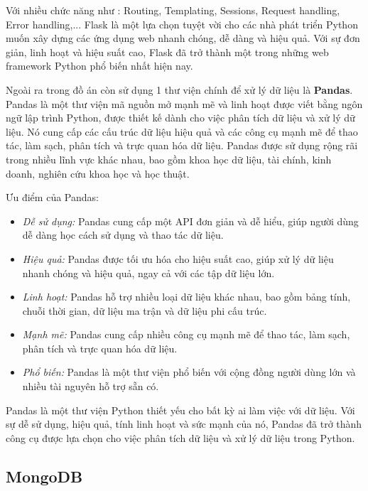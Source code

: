  Với nhiều chức năng như : Routing, Templating, Sessions, Request handling, Error handling,... Flask là một lựa chọn tuyệt vời cho các nhà phát triển Python muốn xây dựng các ứng dụng web nhanh chóng, dễ dàng và hiệu quả. Với sự đơn giản, linh hoạt và hiệu suất cao, Flask đã trở thành một trong những web framework Python phổ biến nhất hiện nay.

Ngoài ra trong đồ án còn sử dụng 1 thư viện chính để xử lý dữ liệu là \textbf{Pandas}. Pandas là một thư viện mã nguồn mở mạnh mẽ và linh hoạt được viết bằng ngôn ngữ lập trình Python, được thiết kế dành cho việc phân tích dữ liệu và xử lý dữ liệu. Nó cung cấp các cấu trúc dữ liệu hiệu quả và các công cụ mạnh mẽ để thao tác, làm sạch, phân tích và trực quan hóa dữ liệu. Pandas được sử dụng rộng rãi trong nhiều lĩnh vực khác nhau, bao gồm khoa học dữ liệu, tài chính, kinh doanh, nghiên cứu khoa học và học thuật.

Ưu điểm của Pandas:
\begin{itemize}
    \item \textit{Dễ sử dụng:} Pandas cung cấp một API đơn giản và dễ hiểu, giúp người dùng dễ dàng học cách sử dụng và thao tác dữ liệu.
    \item \textit{Hiệu quả:} Pandas được tối ưu hóa cho hiệu suất cao, giúp xử lý dữ liệu nhanh chóng và hiệu quả, ngay cả với các tập dữ liệu lớn.
    \item \textit{Linh hoạt:} Pandas hỗ trợ nhiều loại dữ liệu khác nhau, bao gồm bảng tính, chuỗi thời gian, dữ liệu ma trận và dữ liệu phi cấu trúc.
    \item \textit{Mạnh mẽ:} Pandas cung cấp nhiều công cụ mạnh mẽ để thao tác, làm sạch, phân tích và trực quan hóa dữ liệu.
    \item \textit{Phổ biến:} Pandas là một thư viện phổ biến với cộng đồng người dùng lớn và nhiều tài nguyên hỗ trợ sẵn có.
\end{itemize}

Pandas là một thư viện Python thiết yếu cho bất kỳ ai làm việc với dữ liệu. Với sự dễ sử dụng, hiệu quả, tính linh hoạt và sức mạnh của nó, Pandas đã trở thành công cụ được lựa chọn cho việc phân tích dữ liệu và xử lý dữ liệu trong Python.

\subsection{MongoDB}

